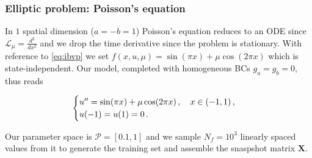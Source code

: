 \documentclass[../main.tex]{subfiles}
\begin{document}
\subsubsection{Elliptic problem: Poisson's equation}\label{subsubsec:poisson}

In $1$ spatial dimension ($a=-b=1$) Poisson's equation reduces to an ODE since $\mathcal{L}_{\mu} = \frac{d^{2}}{dx^{2}}$ and we drop the time derivative since the problem is stationary.
With reference to \eqref{eq:ibvp} we set $f(x,u,\mu)=\sin(\pi x) + \mu\cos(2\pi x)$ which is state-independent.
Our model, completed with homogeneous BCs $g_{a}=g_{b}=0$, thus reads

\begin{equation}\label{eq:poisson}
   \begin{cases}
           u'' = \sin(\pi x) + \mu\cos(2\pi x)\,,\quad x\in(-1,1)\,, \\
           u(-1) = u(1) = 0 \,.
   \end{cases}
\end{equation}

Our parameter space is $\mathcal{P}=[0.1,1]$ and we sample $N_{f}=10^{3}$ linearly spaced values from it to generate the training set and assemble the snaspshot matrix $\boldsymbol{X}$.



\end{document}
